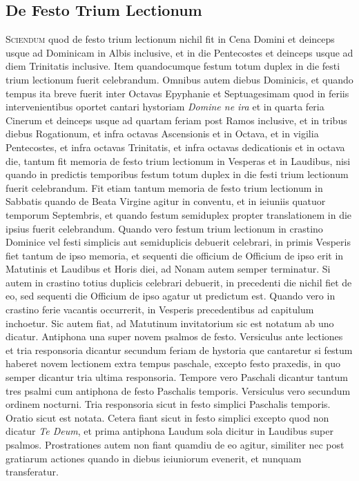 \documentclass[11pt,openany]{book}
\newcommand*\zallmancaps{\usefont{U}{Zallman}{xl}{n}}
\newcommand{\ubsubsection}[2]{%
	\subsection*{#1}%
	\phantomsection%
	\addcontentsline{toc}{subsection}{#1}%
	\hypertarget{#2}{}%
}
\begin{document}
\begin{multicols*}{2}
{\color{Red} \ubsubsection{De Festo Trium Lectionum}{ordinarium-de-festo-trium-lectionum}}
\lettrine[lines=2]{\zallmancaps \color{Blue} S}{ciendum} quod de festo trium lectionum nichil fit in Cena Domini et deinceps usque ad Dominicam in Albis inclusive, et in die Pentecostes et deinceps usque ad diem Trinitatis inclusive.
Item quandocumque festum totum duplex in die festi trium lectionum fuerit celebrandum.
Omnibus autem diebus Dominicis, et quando tempus ita breve fuerit inter Octavas Epyphanie et Septuagesimam quod in feriis intervenientibus oportet cantari hystoriam \textit{Domine ne ira} et in quarta feria Cinerum et deinceps usque ad quartam feriam post Ramos inclusive, et in tribus diebus Rogationum, et infra octavas Ascensionis et in Octava, et in vigilia Pentecostes, et infra octavas Trinitatis, et infra octavas dedicationis et in octava die, tantum fit memoria de festo trium lectionum in Vesperas et in Laudibus, nisi quando in predictis temporibus festum totum duplex in die festi trium lectionum fuerit celebrandum.
Fit etiam tantum memoria de festo trium lectionum in Sabbatis quando de Beata Virgine agitur in conventu, et in ieiuniis quatuor temporum Septembris, et quando festum semiduplex propter translationem in die ipsius fuerit celebrandum.
Quando vero festum trium lectionum in crastino Dominice vel festi simplicis aut semiduplicis debuerit celebrari, in primis Vesperis fiet tantum de ipso memoria, et sequenti die officium de Officium de ipso erit in Matutinis et Laudibus et Horis diei, ad Nonam autem semper terminatur.
Si autem in crastino totius duplicis celebrari debuerit, in precedenti die nichil fiet de eo, sed sequenti die Officium de ipso agatur ut predictum est.
Quando vero in crastino ferie vacantis occurrerit, in Vesperis precedentibus ad capitulum inchoetur.
Sic autem fiat, ad Matutinum invitatorium sic est notatum ab uno dicatur. Antiphona una super novem psalmos de festo. Versiculus ante lectiones et tria responsoria dicantur secundum feriam de hystoria que cantaretur si festum haberet novem lectionem extra tempus paschale, excepto festo praxedis, in quo semper dicantur tria ultima responsoria. Tempore vero Paschali dicantur tantum tres psalmi cum antiphona de festo Paschalis temporis. Versiculus vero secundum ordinem nocturni. Tria responsoria sicut in festo simplici Paschalis temporis. Oratio sicut est notata. Cetera fiant sicut in festo simplici excepto quod non dicatur \textit{Te Deum}, et prima antiphona Laudum sola dicitur in Laudibus super psalmos. Prostrationes autem non fiant quamdiu de eo agitur, similiter nec post gratiarum actiones quando in diebus ieiuniorum evenerit, et nunquam transferatur.


\end{multicols*}
\end{document}
